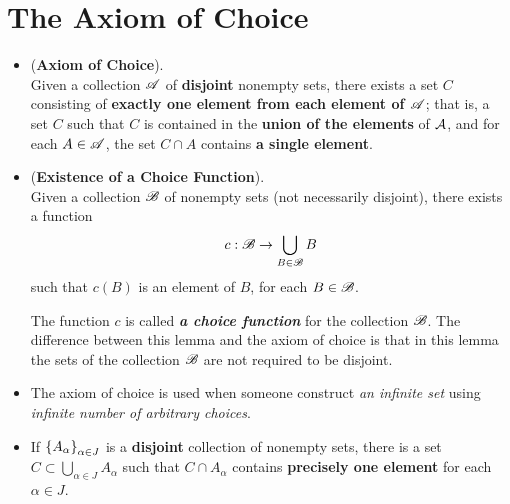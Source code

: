 \documentclass[11pt]{article}
\begin{document}
\section{The Axiom of Choice}
\begin{itemize}
\item \begin{principle} (\textbf{Axiom of Choice}). \citep{munkres2000topology} \\
Given a collection ${\mathscr A}$ of \textbf{disjoint} nonempty sets, there exists a set $C$ consisting of \textbf{exactly one element from each element of ${\mathscr A}$}; that is, a set $C$ such that $C$ is contained in the \textbf{union of the elements} of ${\mathcal A}$, and for each $A \in {\mathscr A}$, the set $C \cap A$ contains \textbf{a single element}.
\end{principle}

\item \begin{lemma} (\textbf{Existence of a Choice Function}). \citep{munkres2000topology}\\
Given a collection ${\mathscr B}$ of nonempty sets (not necessarily disjoint), there exists a function
\begin{align*}
c: {\mathscr B} \rightarrow \bigcup_{B \in {\mathscr B}}B
\end{align*}
such that $c(B)$ is an element of $B$, for each $B \in {\mathscr B}$.
\end{lemma} 

\begin{remark}
The function $c$ is called \emph{\textbf{a choice function}} for the collection ${\mathscr B}$.
The difference between this lemma and the axiom of choice is that in this lemma the sets of the collection ${\mathscr B}$ are not required to be disjoint.
\end{remark}

\item \begin{remark}
The axiom of choice is used when someone construct \emph{an infinite set} using \emph{infinite number of arbitrary choices}.
\end{remark}

\item \begin{corollary}
If $\left\{A_{\alpha}\right\}_{\alpha \in J}$ is a \textbf{disjoint} collection of nonempty sets, there is a set $C \subset \bigcup_{\alpha \in J}A_{\alpha}$ such that $C \cap A_{\alpha}$ contains \textbf{precisely one element} for each $\alpha \in J$.
\end{corollary}
\end{itemize}
\end{document}
